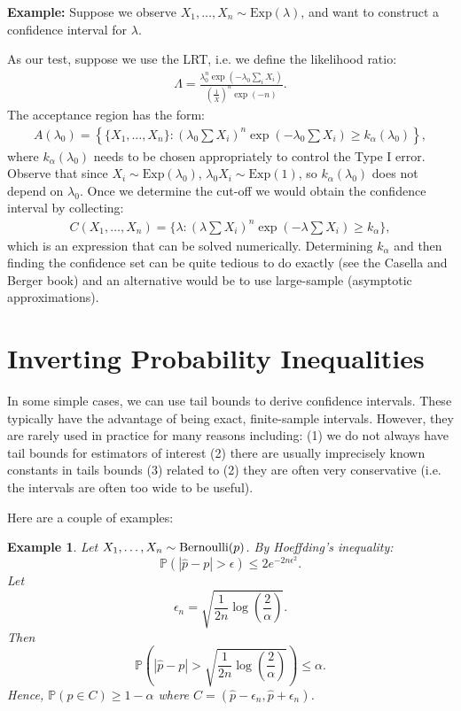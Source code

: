 \documentclass[twoside,12pt]{article}
\newtheorem{example}[theorem]{Example}
\begin{document}
{\bf Example: } Suppose we observe $X_1,\ldots,X_n \sim \text{Exp}(\lambda)$, and want to construct a confidence interval for $\lambda$.

As our test, suppose we use the LRT, i.e. we define the likelihood ratio:
\begin{align*}
\Lambda = \frac{\lambda_0^n \exp (- \lambda_0 \sum_{i} X_i)}{ (\frac{1}{\overline{X}})^n \exp (-n)}.
\end{align*}
The acceptance region has the form:
\begin{align*}
A(\lambda_0) = \left\{ \{X_1,\ldots,X_n\}: \left(\lambda_0 \sum X_i \right)^n \exp (-\lambda_0 \sum X_i) \geq k_{\alpha}(\lambda_0)\right\}, 
\end{align*}
where $k_{\alpha}(\lambda_0)$ needs to be chosen appropriately to control the Type I error. 
Observe that since $X_i \sim \text{Exp}(\lambda_0)$, $\lambda_0 X_i \sim \text{Exp}(1)$, so $k_{\alpha}(\lambda_0)$ does not depend on $\lambda_0$.
Once we determine the cut-off we would obtain the confidence interval by collecting:
\begin{align*}
C(X_1,\ldots,X_n) = \{\lambda: \left(\lambda \sum X_i \right)^n \exp (-\lambda \sum X_i) \geq k_{\alpha} \},
\end{align*}
which is an expression that can be solved numerically.
Determining $k_{\alpha}$ and then finding the confidence set can be quite tedious to do exactly (see the Casella and Berger book) and an alternative would be to use large-sample (asymptotic approximations).

\section{Inverting Probability Inequalities}
In some simple cases, we can use tail bounds to derive confidence intervals. These typically have the advantage of being exact, finite-sample intervals. However, they are rarely used in practice for many reasons including: (1) we do not always have tail bounds for estimators of interest (2) there are usually imprecisely known constants in tails bounds (3) related to (2) they are often very conservative (i.e. the intervals are often too wide to be useful).

Here are a couple of examples:

\begin{example}
Let $X_1,\ldots, X_n \sim {\rm Bernoulli}(p)$.
By Hoeffding's inequality:
$$
\mathbb{P}(|\widehat p - p | > \epsilon) \leq 2 e^{-2n\epsilon^2}.
$$
Let
$$
\epsilon_n = \sqrt{\frac{1}{2n}\log\left(\frac{2}{\alpha}\right)}.
$$
Then
$$
\mathbb{P}\left( | \widehat{p}-p| > \sqrt{\frac{1}{2n}\log\left(\frac{2}{\alpha}\right)}\right)\leq \alpha.
$$
Hence,
$\mathbb{P}(p\in C)\ge 1-\alpha$ where
$C=(\widehat p -\epsilon_n,\widehat p +\epsilon_n)$.
\end{example}
\end{document}
